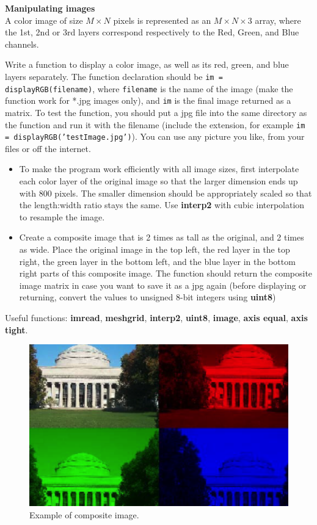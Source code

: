 \documentclass[12pt]{TDTP}
\begin{document}
\newpage
\Exo
\textbf{Manipulating images}\\
A color image of size $M\times N$ pixels is represented as an $M\times N \times 3$ array, where the 1st, 2nd or 3rd layers correspond respectively to the Red, Green, and Blue channels.

Write a function to display a color image, as well as its red, green, and blue layers separately. 
The function declaration should be \texttt{im = displayRGB(filename)}, where \texttt{filename} is the name of the image (make the function work for *.jpg images only), and  \texttt{im} is the final image returned as a matrix.
To test the function, you should put a jpg file into the same directory as the function and run it with the filename (include the extension, for example \texttt{im = displayRGB('testImage.jpg')}).
You can use any picture you like, from your files or off the internet. 
\begin{itemize}
\item To make the program work efficiently with all image sizes, first interpolate each color layer of the original image so that the larger dimension ends up with 800 pixels. The smaller dimension should be appropriately scaled so that the length:width ratio stays the same. 
Use \textbf{interp2} with cubic interpolation to resample the image.

\item Create a composite image that is 2 times as tall as the original, and 2 times as wide. 
Place the original image in the top left, the red layer in the top right, the green layer in the bottom left, and the blue layer in the bottom right parts of this composite image. 
The function should return the composite image matrix in case you want to save it as a jpg again (before displaying or returning, convert the values to unsigned 8-bit integers using \textbf{uint8})
\end{itemize}

Useful functions: \textbf{imread}, \textbf{meshgrid}, \textbf{interp2}, \textbf{uint8}, \textbf{image}, \textbf{axis equal}, \textbf{axis tight}.

\begin{figure}[h!]
\begin{center}
\includegraphics[scale=0.7]{images/composite.png}
\caption{Example of composite image.}
\end{center}
\end{figure}
\end{document}
